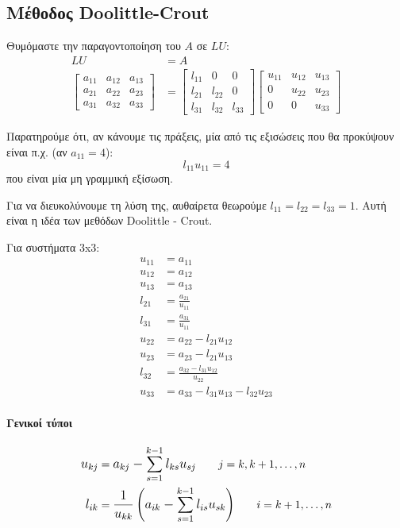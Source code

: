 \documentclass[11pt,a4paper,notitlepage,fleqn,final]{article}
\begin{document}
\subsection{Μέθοδος Doolittle-Crout}
Θυμόμαστε την παραγοντοποίηση του \( A \) σε \( LU \):
\begin{align*}
	LU &= A \\
	\left[\begin{matrix}
	a_{11} & a_{12} & a_{13} \\
	a_{21} & a_{22} & a_{23} \\
	a_{31} & a_{32} & a_{33}
	\end{matrix}\right] &= \left[\begin{matrix}
	l_{11} & 0 & 0 \\
	l_{21} & l_{22} & 0 \\
	l_{31} & l_{32} & l_{33}
	\end{matrix}\right]\left[\begin{matrix}
	u_{11} & u_{12} & u_{13} \\
	0 & u_{22} & u_{23} \\
	0 & 0 & u_{33}
	\end{matrix}\right]
\end{align*}

	Παρατηρούμε ότι, αν κάνουμε τις πράξεις, μία από τις εξισώσεις
που θα προκύψουν είναι π.χ. (αν \( a_{11} = 4 \)):
\[
l_{11}u_{11} = 4
\]
που είναι μία μη γραμμική εξίσωση.

Για να διευκολύνουμε τη λύση της, αυθαίρετα θεωρούμε \( l_{11}=l_{22}=l_{33}=1 \).
Αυτή είναι η ιδέα των μεθόδων Doolittle - Crout.

Για συστήματα 3x3:
\begin{align*}
	u_{11} &= a_{11} \\
	u_{12} &= a_{12} \\
	u_{13} &= a_{13} \\[3ex]
	l_{21} &= \frac{a_{21}}{u_{11}} \\
	l_{31} &= \frac{a_{31}}{u_{11}} \\[3ex]
	u_{22} &= a_{22} - l_{21}u_{12} \\
	u_{23} &= a_{23} - l_{21}u_{13} \\[3ex]
	l_{32} &= \frac{a_{32}-l_{31}u_{12}}{u_{22}} \\
	u_{33} &= a_{33} - l_{31}u_{13} - l_{32}u_{23}
\end{align*}

\paragraph{Γενικοί τύποι}
\begin{align*}
	\mathlarger{u_{kj}} &=
	\mathlarger{a_{kj}-\sum_{s=1}^{k-1} l_{ks}u_{sj} }
	\qquad j=k,k+1,\dots,n \\
	\mathlarger{l_{ik}} &=
	\mathlarger{
	\frac{1}{u_{kk}} \left(a_{ik}-\sum_{s=1}^{k-1}
	l_{is}u_{sk}\right)
    }\qquad i=k+1,\dots,n
\end{align*}
\end{document}
